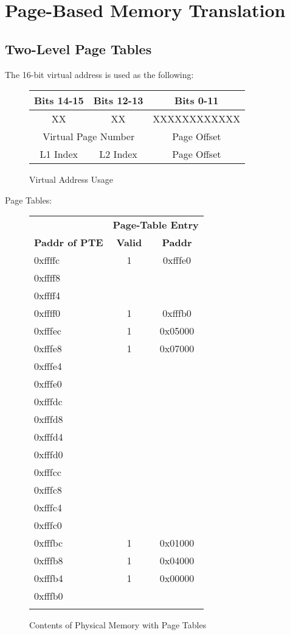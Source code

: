\documentclass[10pt]{article}
\begin{document}
\cleardoublepage
\section{Page-Based Memory Translation}

\subsection{Two-Level Page Tables}
The 16-bit virtual address is used as the following:
\begin{figure}[H]
\centering
\begin{tabular}{|c|c|c|}
\hline
Bits 14-15 & Bits 12-13 & Bits 0-11 \\
\hline
XX & XX & XXXXXXXXXXXX \\
\hline
\multicolumn{2}{|c}{Virtual Page Number} & Page Offset \\
L1 Index & L2 Index & Page Offset \\
\hline
\end{tabular}
\caption{Virtual Address Usage}
\end{figure}
Page Tables:
\begin{figure}[H]
\centering
{
\begin{tabular}{@{\extracolsep{3pt}}lcc@{}}
\Xhline{2\arrayrulewidth}
& \multicolumn{2}{c}{\textbf{Page-Table Entry}} \\
\textbf{Paddr of PTE} & \textbf{Valid} & \textbf{Paddr}\\
\Xhline{2\arrayrulewidth}
0xffffc & 1 & 0xfffe0 \\
\hline
0xffff8 & &  \\
\hline
0xffff4 & &  \\
\hline
0xffff0 & 1 & 0xfffb0 \\
\Xhline{2\arrayrulewidth}
0xfffec & 1 & 0x05000 \\
\hline
0xfffe8 & 1 & 0x07000 \\
\hline
0xfffe4 & &  \\
\hline
0xfffe0 & & \\
\Xhline{2\arrayrulewidth}
0xfffdc & & \\
\hline
0xfffd8 & &  \\
\hline
0xfffd4 & &  \\
\hline
0xfffd0 & & \\
\Xhline{2\arrayrulewidth}
0xfffcc & & \\
\hline
0xfffc8 & &  \\
\hline
0xfffc4 & &  \\
\hline
0xfffc0 & & \\
\Xhline{2\arrayrulewidth}
0xfffbc & 1 & 0x01000\\
\hline
0xfffb8 & 1 & 0x04000\\
\hline
0xfffb4 & 1 & 0x00000 \\
\hline
0xfffb0 & & \\
\Xhline{2\arrayrulewidth}
\end{tabular}
}
\caption{Contents of Physical Memory with Page Tables}
\end{figure}
\end{document}
